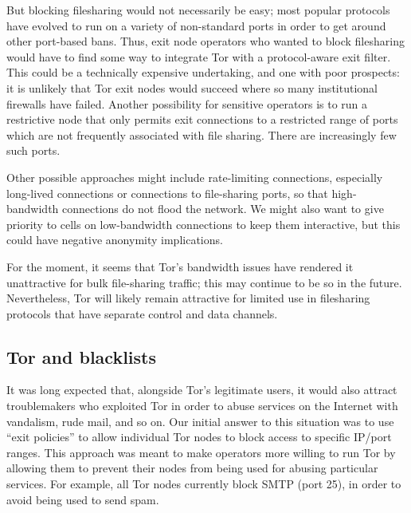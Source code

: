 \documentclass{llncs}
\begin{document}
But blocking filesharing would not necessarily be easy; most popular
protocols have evolved to run on a variety of non-standard ports in order to
get around other port-based bans.  Thus, exit node operators who wanted to
block filesharing would have to find some way to integrate Tor with a
protocol-aware exit filter.  This could be a technically expensive
undertaking, and one with poor prospects: it is unlikely that Tor exit nodes
would succeed where so many institutional firewalls have failed.  Another
possibility for sensitive operators is to run a restrictive node that
only permits exit connections to a restricted range of ports which are
not frequently associated with file sharing.  There are increasingly few such
ports.

Other possible approaches might include rate-limiting connections, especially
long-lived connections or connections to file-sharing ports, so that
high-bandwidth connections do not flood the network.  We might also want to
give priority to cells on low-bandwidth connections to keep them interactive,
but this could have negative anonymity implications.

For the moment, it seems that Tor's bandwidth issues have rendered it
unattractive for bulk file-sharing traffic; this may continue to be so in the
future.  Nevertheless, Tor will likely remain attractive for limited use in
filesharing protocols that have separate control and data channels.



\subsection{Tor and blacklists}

It was long expected that, alongside Tor's legitimate users, it would also
attract troublemakers who exploited Tor in order to abuse services on the
Internet with vandalism, rude mail, and so on.
Our initial answer to this situation was to use ``exit policies''
to allow individual Tor nodes to block access to specific IP/port ranges.
This approach was meant to make operators more willing to run Tor by allowing
them to prevent their nodes from being used for abusing particular
services.  For example, all Tor nodes currently block SMTP (port 25), in
order to avoid being used to send spam.
\end{document}
